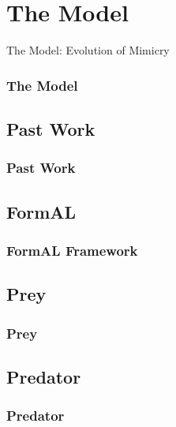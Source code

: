 \section{The Model}

\frame
{
	\begin{center}
		\LARGE The Model: Evolution of Mimicry
	\end{center}
}

\frame
{
	\frametitle{The Model}
}

\subsection{Past Work}

\frame
{
	\frametitle{Past Work}
}

\subsection{FormAL}

\frame
{
	\frametitle{FormAL Framework}
}

\subsection{Prey}

\frame
{
	\frametitle{Prey}
}

\subsection{Predator}

\frame
{
	\frametitle{Predator}
}